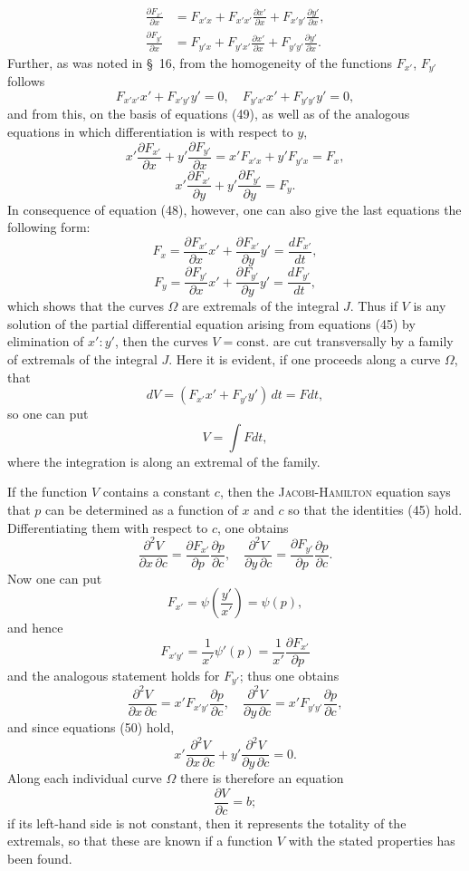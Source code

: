 \documentclass[11pt,a4paper,leqno]{article}
\begin{document}
\begin{equation}\tag{49}
\begin{aligned}
\frac{\partial F_{x'}}{\partial x}
&=
F_{x'x}+F_{x'x'}\frac{\partial x'}{\partial x}
+F_{x'y'}\frac{\partial y'}{\partial x},\\
\frac{\partial F_{y'}}{\partial x}
&=
F_{y'x}+F_{y'x'}\frac{\partial x'}{\partial x}
+F_{y'y'}\frac{\partial y'}{\partial x}.
\end{aligned}
\end{equation}
Further, as was noted in \S~16, from the homogeneity of the functions $F_{x'}$, $F_{y'}$ follows
\begin{equation}\tag{50}
F_{x'x'}x'+F_{x'y'}y'=0,\quad
F_{y'x'}x'+F_{y'y'}y'=0,
\end{equation}
and from this, on the basis of equations (49), as well as of the analogous equations in which differentiation is with respect to $y$,
\[
x'\frac{\partial F_{x'}}{\partial x}
+y'\frac{\partial F_{y'}}{\partial x}
=
x'F_{x'x}+y'F_{y'x}=F_x,
\]
\[
x'\frac{\partial F_{x'}}{\partial y}
+y'\frac{\partial F_{y'}}{\partial y}=F_y.
\]
In consequence of equation (48), however, one can also give the last equations the following form:
\[
F_x=
\frac{\partial F_{x'}}{\partial x}x'
+\frac{\partial F_{x'}}{\partial y}y'
=\frac{dF_{x'}}{dt},
\]
\[
F_y=
\frac{\partial F_{y'}}{\partial x}x'
+\frac{\partial F_{y'}}{\partial y}y'
=\frac{dF_{y'}}{dt},
\]
which shows that the curves $\Omega$ are extremals of the integral $J$. Thus if $V$ is any solution of the partial differential equation arising from equations (45) by elimination of $x':y'$, then the curves $V=\text{const.}$ are cut transversally by a family of extremals of the integral $J$. Here it is evident, if one proceeds along a curve $\Omega$, that
\[
dV=(F_{x'}x'+F_{y'}y')\,dt=Fdt,
\]
so one can put
\[
V=\int Fdt,
\]
where the integration is along an extremal of the family.

If the function $V$ contains a constant $c$, then the \textsc{Jacobi-Hamilton} equation says that $p$ can be determined as a function of $x$ and $c$ so that the identities (45) hold. Differentiating them with respect to $c$, one obtains
\[
\frac{\partial^2 V}{\partial x\,\partial c}
=
\frac{\partial F_{x'}}{\partial p}\frac{\partial p}{\partial c},\quad
\frac{\partial^2 V}{\partial y\,\partial c}
=
\frac{\partial F_{y'}}{\partial p}\frac{\partial p}{\partial c}.
\]
Now one can put
\[
F_{x'}=\psi\left(\frac{y'}{x'}\right)=\psi(p),
\]
and hence
\[
F_{x'y'}=\frac{1}{x'}\psi'(p)=\frac{1}{x'}\frac{\partial F_{x'}}{\partial p}
\]
and the analogous statement holds for $F_{y'}$; thus one obtains
\[
\frac{\partial^2 V}{\partial x\,\partial c}
=
x'F_{x'y'}\frac{\partial p}{\partial c},\quad
\frac{\partial^2 V}{\partial y\,\partial c}
=
x'F_{y'y'}\frac{\partial p}{\partial c},
\]
and since equations (50) hold,
\[
x'\frac{\partial^2V}{\partial x\,\partial c}
+
y'\frac{\partial^2V}{\partial y\,\partial c}=0.
\]
Along each individual curve $\Omega$ there is therefore an equation
\[
\frac{\partial V}{\partial c}=b;
\]
if its left-hand side is not constant, then it represents the totality of the extremals, so that these are known if a function $V$ with the stated properties has been found.
\end{document}
